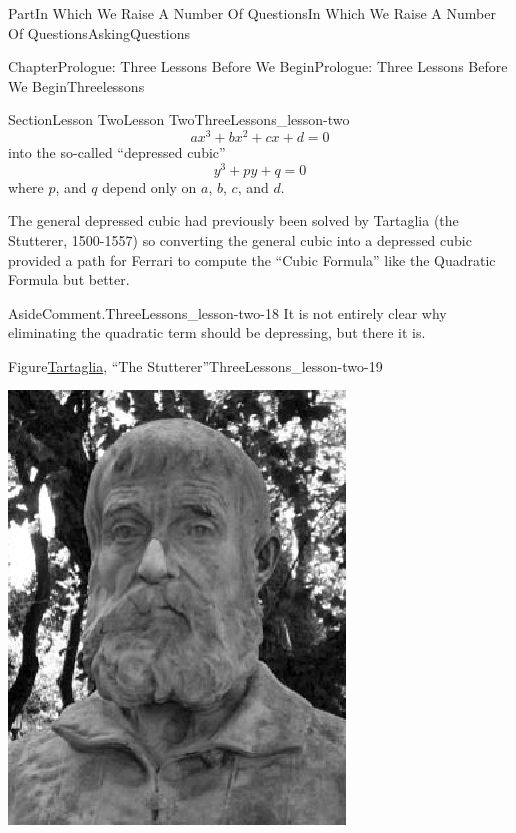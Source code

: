 \documentclass[oneside,10pt,]{book}
\numberwithin{equation}{part}
\begin{document}
\begin{partptx}{Part}{In Which We Raise A Number Of Questions}{}{In Which We Raise A Number Of Questions}{}{}{AskingQuestions}
\begin{chapterptx}{Chapter}{Prologue: Three Lessons Before We Begin}{}{Prologue: Three Lessons Before We Begin}{}{}{Threelessons}
\begin{sectionptx}{Section}{Lesson Two}{}{Lesson Two}{}{}{ThreeLessons_lesson-two}
\begin{equation}
ax^3+bx^2+cx+d=0\label{eq_GenCubic}
\end{equation}
into the so-called ``depressed cubic''%
\begin{equation*}
y^3 +py+q=0
\end{equation*}
where \(p\), and \(q\) depend only on \(a\), \(b\), \(c\), and \(d\).%
\par
The general depressed cubic had previously been solved by Tartaglia (the Stutterer, 1500-1557) so converting the general cubic into a depressed cubic provided a path for Ferrari to compute the ``Cubic Formula'' \textemdash{} like the Quadratic Formula but better.%
\begin{aside}{Aside}{Comment.}{ThreeLessons_lesson-two-18}%
It is not entirely clear why eliminating the quadratic term should be depressing, but there it is.%
\end{aside}
\begin{figureptx}{Figure}{\href{https://mathshistory.st-andrews.ac.uk/Biographies/Tartaglia/}{Tartaglia}\protect\footnotemark{}, ``The Stutterer''}{ThreeLessons_lesson-two-19}{}%
\begin{image}{0.36}{0.28}{0.36}{}%
\includegraphics[width=\linewidth]{external/images/Tartaglia.png}

\end{image}
\end{figureptx}
\end{sectionptx}
\end{chapterptx}
\end{partptx}
\end{document}
